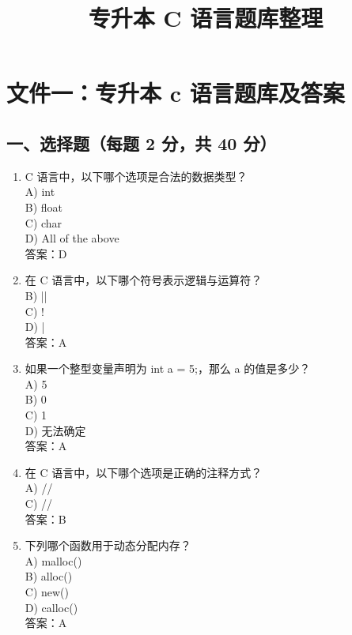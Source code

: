 \documentclass[a4paper,12pt]{article}
\title{专升本 C 语言题库整理}
\author{}
\date{}
\begin{document}
\maketitle

\section{文件一：专升本 c 语言题库及答案}

\subsection{一、选择题（每题 2 分，共 40 分）}

\begin{enumerate}
    \item C 语言中，以下哪个选项是合法的数据类型？\\
    A) int \\
    B) float \\
    C) char \\
    D) All of the above \\
    答案：D

    \item 在 C 语言中，以下哪个符号表示逻辑与运算符？\\
    B) || \\
    C) ! \\
    D) | \\
    答案：A

    \item 如果一个整型变量声明为 int a = 5;，那么 a 的值是多少？\\
    A) 5 \\
    B) 0 \\
    C) 1 \\
    D) 无法确定 \\
    答案：A

    \item 在 C 语言中，以下哪个选项是正确的注释方式？\\
    A) // \\
    C) // \\
    答案：B

    \item 下列哪个函数用于动态分配内存？\\
    A) malloc() \\
    B) alloc() \\
    C) new() \\
    D) calloc() \\
    答案：A


\end{enumerate}
\end{document}
